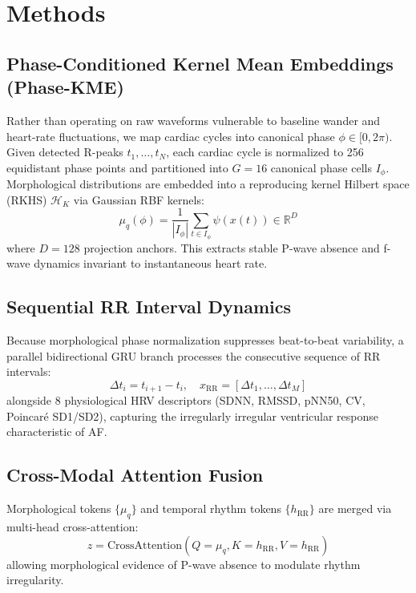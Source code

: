 \documentclass[10pt,twocolumn,letterpaper]{article}
\begin{document}
\section{Methods}

\subsection{Phase-Conditioned Kernel Mean Embeddings (Phase-KME)}
Rather than operating on raw waveforms vulnerable to baseline wander and heart-rate fluctuations, we map cardiac cycles into canonical phase $\phi \in [0, 2\pi)$. Given detected R-peaks $t_1, \dots, t_N$, each cardiac cycle is normalized to 256 equidistant phase points and partitioned into $G = 16$ canonical phase cells $I_\phi$. Morphological distributions are embedded into a reproducing kernel Hilbert space (RKHS) $\mathcal{H}_K$ via Gaussian RBF kernels:
\begin{equation}
\mu_q(\phi) = \frac{1}{|I_\phi|} \sum_{t \in I_\phi} \psi(x(t)) \in \mathbb{R}^{D}
\end{equation}
where $D = 128$ projection anchors. This extracts stable P-wave absence and f-wave dynamics invariant to instantaneous heart rate.

\subsection{Sequential RR Interval Dynamics}
Because morphological phase normalization suppresses beat-to-beat variability, a parallel bidirectional GRU branch processes the consecutive sequence of RR intervals:
\begin{equation}
\Delta t_i = t_{i+1} - t_i, \quad x_{\text{RR}} = [\Delta t_1, \dots, \Delta t_M]
\end{equation}
alongside 8 physiological HRV descriptors (SDNN, RMSSD, pNN50, CV, Poincaré SD1/SD2), capturing the irregularly irregular ventricular response characteristic of AF.

\subsection{Cross-Modal Attention Fusion}
Morphological tokens $\{\mu_q\}$ and temporal rhythm tokens $\{h_{\text{RR}}\}$ are merged via multi-head cross-attention:
\begin{equation}
z = \text{CrossAttention}(Q = \mu_q, K = h_{\text{RR}}, V = h_{\text{RR}})
\end{equation}
allowing morphological evidence of P-wave absence to modulate rhythm irregularity.
\end{document}
